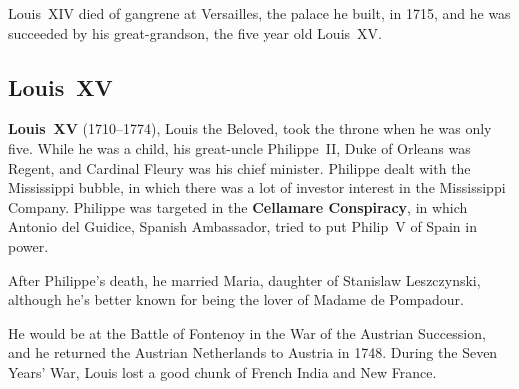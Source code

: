 Louis~XIV died of gangrene at Versailles, the palace he built, in 1715,
and he was succeeded by his great-grandson, the five year old Louis~XV\@.

\subsection*{Louis~XV}

\textbf{Louis~XV} (1710--1774), Louis the Beloved, took the throne when he was only five.
While he was a child, his great-uncle Philippe~II, Duke of Orleans was Regent,
and Cardinal Fleury was his chief minister.
Philippe dealt with the Mississippi bubble,
in which there was a lot of investor interest in the Mississippi Company.
Philippe was targeted in the \textbf{Cellamare Conspiracy},
in which Antonio del Guidice, Spanish Ambassador, tried to put Philip~V of Spain in power.

After Philippe's death, he married Maria, daughter of Stanislaw Leszczynski,
although he's better known for being the lover of Madame de Pompadour.

He would be at the Battle of Fontenoy in the War of the Austrian Succession,
and he returned the Austrian Netherlands to Austria in 1748.
During the Seven Years' War, Louis lost a good chunk of French India and New France.
